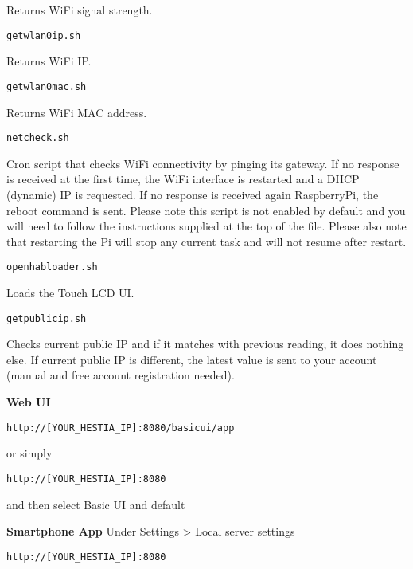 Returns WiFi signal strength.

\texttt{getwlan0ip.sh }

Returns WiFi IP.

\texttt{getwlan0mac.sh }

Returns WiFi MAC address.

\texttt{netcheck.sh }

Cron script that checks WiFi connectivity by pinging its gateway. If no
response is received at the first time, the WiFi interface is restarted and a
DHCP (dynamic) IP is requested. If no response is received again RaspberryPi,
the reboot command is sent. Please note this script is not enabled by default
and you will need to follow the instructions supplied at the top of the file.
Please also note that restarting the Pi will stop any current task and will not
resume after restart.

\texttt{openhabloader.sh }

Loads the Touch LCD UI.

\texttt{getpublicip.sh }

Checks current public IP and if it matches with previous reading, it does
nothing else. If current public IP is different, the latest value is sent to
your account (manual and free account registration needed).
    
\textbf{Web UI}

\texttt{http://[YOUR\_HESTIA\_IP]:8080/basicui/app}

or simply


\texttt{http://[YOUR\_HESTIA\_IP]:8080}

and then select Basic UI and default

\textbf{Smartphone App}
Under Settings > Local server settings


\texttt{http://[YOUR\_HESTIA\_IP]:8080}
